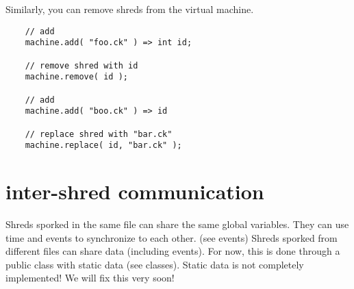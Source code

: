 Similarly, you can remove shreds from the virtual machine.
\begin{verbatim}
    // add
    machine.add( "foo.ck" ) => int id;

    // remove shred with id
    machine.remove( id );

    // add
    machine.add( "boo.ck" ) => id

    // replace shred with "bar.ck"
    machine.replace( id, "bar.ck" );
\end{verbatim}
 

\section{inter-shred communication}

Shreds sporked in the same file can share the same global variables. They can use time and events to synchronize to each other. (see events) Shreds sporked from different files can share data (including events). For now, this is done through a public class with static data (see  classes). Static data is not completely implemented! We will fix this very soon!